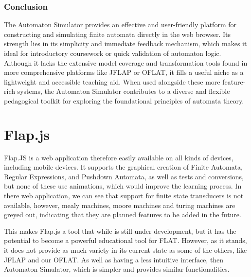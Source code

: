 \subsubsection*{Conclusion}

The Automaton Simulator provides an effective and user-friendly platform for constructing and simulating finite automata directly in the web browser. 
Its strength lies in its simplicity and immediate feedback mechanism, which makes it ideal for introductory coursework or quick validation of automaton logic.
Although it lacks the extensive model coverage and transformation tools found in more comprehensive platforms like JFLAP or OFLAT, 
it fills a useful niche as a lightweight and accessible teaching aid. When used alongside these more feature-rich systems, 
the Automaton Simulator contributes to a diverse and flexible pedagogical toolkit for exploring the foundational principles of automata theory.


\section{Flap.js}
Flap.JS is a web application therefore easily available on all kinds of devices, including mobile
devices. It supports the graphical creation of Finite Automata, Regular Expressions, and
Pushdown Automata, as well as tests and conversions, but none of these use animations, which would improve the
learning process.
In there web application, we can see that support for finite state transducers is not available, however,
mealy machines, moore machines and turing machines are greyed out, indicating that they are planned features to be added in the future.

This makes Flap.js a tool that while is still under development, but it has the potential to become a powerful educational tool for FLAT.
However, as it stands, it does not provide as much variety in its current state as some of the others, like JFLAP and our OFLAT. As well as having a less intuitive interface,
then Automaton Simulator, which is simpler and provides similar functionalities.

